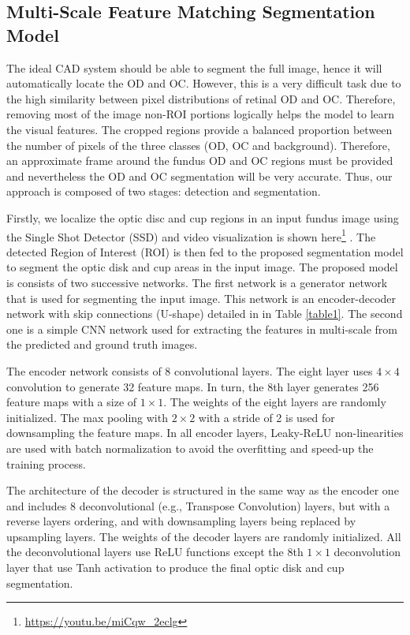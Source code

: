 \documentclass[runningheads,a4paper]{llncs}
\begin{document}
\subsection{Multi-Scale Feature Matching Segmentation Model }


The ideal CAD system should be able to segment the full image, hence it will automatically locate the OD and OC. However, this is a very difficult task due to the high similarity between pixel distributions of retinal OD and OC. Therefore, removing most of the image non-ROI portions logically helps the model to learn the visual features. The cropped regions provide a balanced proportion between the number of pixels of the three classes (OD, OC and background). Therefore, an approximate frame around the fundus OD and OC regions must be provided and nevertheless the OD and OC segmentation will be very accurate. Thus, our approach is composed of two stages: detection and segmentation.

Firstly, we localize the optic disc and cup regions in an input fundus image using the Single Shot Detector  (SSD) \cite{liu2016ssd}  and video visualization is shown here\footnote{\url{https://youtu.be/miCqw_2eclg}} . The detected Region of Interest (ROI) is then fed to the proposed segmentation model to segment the optic disk and cup areas in the input image. The proposed model is consists of two successive networks. The first network is a generator network that is used for segmenting the input image. This network is an encoder-decoder network with skip connections (U-shape) detailed in in Table \ref{table1}. The second one is a simple CNN network used for extracting the features in multi-scale from the predicted and ground truth images.

The encoder network consists of 8 convolutional layers. The eight layer uses $4\times 4$ convolution to generate 32 feature maps. 
In turn, the 8th layer generates 256 feature maps with a size of $1\times 1$. The weights of the eight layers are randomly initialized. The max pooling with $2\times 2$ with a stride of 2 is used for downsampling the feature maps. In all encoder layers, Leaky-ReLU non-linearities are used with batch normalization to avoid the overfitting and speed-up the training process.


The architecture of the decoder is structured in the same way as the encoder one and includes 8 deconvolutional (e.g., Transpose Convolution) layers, but with a reverse layers ordering, and with downsampling layers being replaced by upsampling layers. The weights of the decoder layers are randomly initialized. All the deconvolutional layers use ReLU functions except the 8th $1\times 1$ deconvolution layer that use Tanh activation to produce the final optic disk and cup segmentation.
\end{document}
